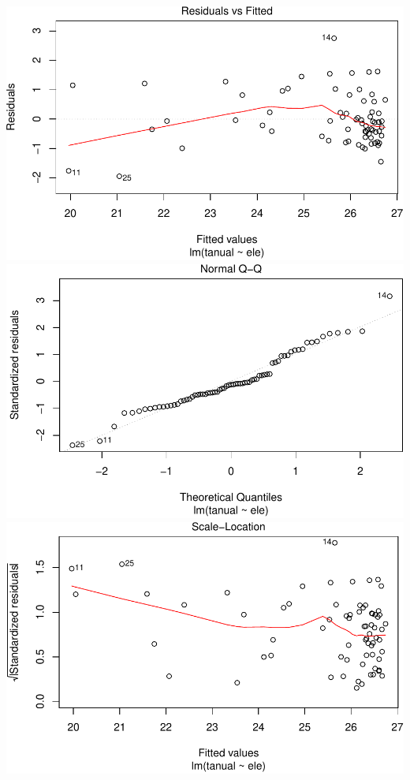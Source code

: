\documentclass[11pt,]{article}
\begin{document}
\includegraphics[width=600px]{Proyecto-Precipitaciones_files/figure-latex/agregar-y-modelo-2}
\includegraphics[width=600px]{Proyecto-Precipitaciones_files/figure-latex/agregar-y-modelo-3}
\includegraphics[width=600px]{Proyecto-Precipitaciones_files/figure-latex/agregar-y-modelo-4}
\end{document}
